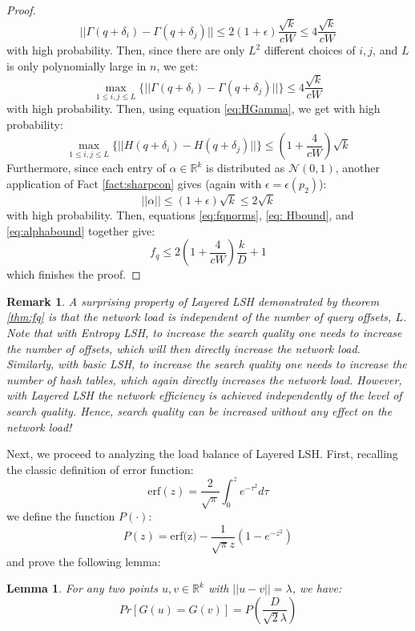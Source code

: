 \documentclass{acm_proc_article-sp}
\numberwithin{equation}{section}
\numberwithin{figure}{section}
\newtheorem{lemma}[thm]{Lemma}
\newtheorem{rem}[thm]{Remark}
\newcommand{\algo}{Layered LSH}
\begin{document}
\begin{proof}
\[
||\Gamma(q+\delta_i) - \Gamma(q+\delta_j)|| \leq 2(1+\epsilon)\frac{\sqrt{k}}{cW} \leq 4\frac{\sqrt{k}}{cW}
\]
with high probability. Then, since there are only $L^2$ different choices of $i,j$, and $L$ is only polynomially large in $n$, we get:
\[
\max_{1\leq i,j\leq L} \{||\Gamma(q+\delta_i) - \Gamma(q+\delta_j)||\} \leq 4\frac{\sqrt{k}}{cW}
\]
with high probability. Then, using equation \ref{eq:HGamma}, we get with high probability:
\begin{equation}
\label{eq: Hbound}
\max_{1\leq i,j\leq L} \{||H(q+\delta_i) - H(q+\delta_j)||\} \leq (1+\frac{4}{cW})\sqrt{k}
\end{equation}
Furthermore, since each entry of $\alpha\in \mathbb{R}^k$ is distributed as $\mathcal{N}(0,1)$, another application of Fact \ref{fact:sharpcon} gives (again with $\epsilon=\epsilon(p_2)$): 
\begin{equation}
\label{eq:alphabound}
||\alpha||\leq (1+\epsilon)\sqrt{k} \leq 2\sqrt{k}
\end{equation}
with high probability. Then, equations \ref{eq:fqnorms}, \ref{eq: Hbound}, and \ref{eq:alphabound} together give:
\[
f_q \leq 2(1+\frac{4}{cW})\frac{k}{D}+1
\]
which finishes the proof. 
\end{proof}
\begin{rem} A surprising property of Layered LSH demonstrated by theorem \ref{thm:fq} is that the network load is independent of the number of query offsets, $L$. Note that with Entropy LSH, to increase the search quality one needs to increase the number of offsets, which will then directly increase the network load. Similarly, with basic LSH, to increase the search quality one needs to increase the number of hash tables, which again directly increases the network load. However, with Layered LSH the network efficiency is achieved independently of the level of search quality. Hence, search quality can be increased without any effect on the network load! 
\end{rem}
Next, we proceed to analyzing the load balance of \algo. First, recalling the classic definition of error function:
\[
\mbox{erf}(z) = \frac{2}{\sqrt{\pi}}\int_{0}^{z} e^{-\tau^2} d\tau
\]
we define the function $P(\cdot)$:
\begin{equation}\label{eq:P}
P(z) = \mbox{erf(z)} - \frac{1}{\sqrt{\pi}z}(1-e^{-z^2})
\end{equation}
and prove the following lemma:
\begin{lemma} For any two points $u,v\in \mathbb{R}^k$ with $||u-v||=\lambda$, we have:
\label{lem:GueqGv}
\[
Pr[G(u)=G(v)] = P(\frac{D}{\sqrt{2}\lambda})
\]
\end{lemma}
\end{document}
